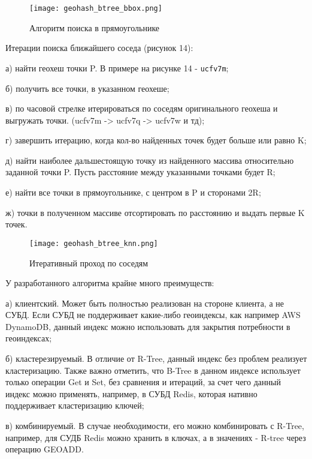 \par\vspace{1em}
\begin{figure}[H]
    \centering
    \texttt{[image: geohash\_btree\_bbox.png]}
    \caption{Алгоритм поиска в прямоугольнике}
\end{figure}
\par\vspace{1em}
  
Итерации поиска ближайшего соседа (рисунок 14):
\par а) найти геохеш точки P. В примере на рисунке 14 - \texttt{ucfv7m};
\par б) получить все точки, в указанном геохеше;
\par в) по часовой стрелке итерироваться по соседям оригинального геохеша и выгружать точки. (ucfv7m -> ucfv7q -> ucfv7w и тд);
\par г) завершить итерацию, когда кол-во найденных точек будет больше или равно K;
\par д) найти наиболее дальшестоящую точку из найденного массива относительно заданной точки P. Пусть расстояние между указанными точками будет R;
\par е) найти все точки в прямоугольнике, с центром в P и сторонами 2R;
\par ж) точки в полученном массиве отсортировать по расстоянию и выдать первые K точек.
  
\par\vspace{1em}
\begin{figure}[H]
    \centering
    \texttt{[image: geohash\_btree\_knn.png]}
    \caption{Итеративный проход по соседям}
\end{figure}
\par\vspace{1em}
  
У разработанного алгоритма крайне много преимуществ:
\par а) клиентский. Может быть полностью реализован на стороне клиента, а не СУБД. Если СУБД не поддерживает какие-либо геоиндексы, как например AWS DynamoDB, данный индекс можно использовать для закрытия потребности в геоиндексах;
\par б) кластерезируемый. В отличие от R-Tree, данный индекс без проблем реализует кластеризацию. Также важно отметить, что B-Tree в данном индексе использует только операции Get и Set, без сравнения и итераций, за счет чего данный индекс можно применять, например, в СУБД Redis, которая нативно поддерживает кластеризацию ключей;
\par в) комбинируемый. В случае необходимости, его можно комбинировать с R-Tree, например, для СУДБ Redis можно хранить в ключах, а в значениях - R-tree через операцию GEOADD\cite{redisGeo}.
    
